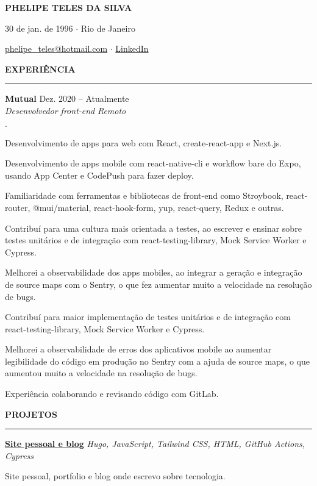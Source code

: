 \documentclass[11pt,letterpaper]{article}
\newenvironment{tightlist}
  {\begin{list}
    {$\cdot$}
    {
      \setlength{\leftmargin}{0em}
      \setlength{\itemsep}{-\smallskipamount}
    }
  }
{\end{list}}
\begin{document}
\pagestyle{empty}

\centerline{\huge\bf PHELIPE TELES DA SILVA}
\medskip

\centerline{30 de jan. de 1996 $\cdot$ Rio de Janeiro}
\smallskip

\centerline{
  \href{mailto:phelipe_teles@hotmail.com}{phelipe\_teles@hotmail.com}
  $\cdot$
  \href{https://linkedin.com/in/phelipeteles}{LinkedIn}
}
\smallskip

\medskip \textbf{EXPERIÊNCIA} \medskip
\hrule

\textbf{Mutual} \hfill Dez. 2020 -- Atualmente \\
\emph{Desenvolvedor front-end} \hfill \emph{Remoto} {\parfillskip=0pt\par}

\begin{tightlist}
  \item Desenvolvimento de apps para web com React, create-react-app e Next.js.
  \item Desenvolvimento de apps mobile com react-native-cli e workflow bare do
    Expo, usando App Center e CodePush para fazer deploy.
  \item Familiaridade com ferramentas e bibliotecas de front-end como
    Stroybook, react-router, @mui/material, react-hook-form, yup,
    react-query, Redux e outras.
  \item Contribuí para uma cultura mais orientada a testes, ao escrever e
    ensinar sobre testes unitários e de integração com
    react-testing-library, Mock Service Worker e Cypress.
  \item Melhorei a observabilidade dos apps mobiles, ao integrar a geração e
    integração de source maps com o Sentry, o que fez aumentar muito a
    velocidade na resolução de bugs.
  \item Contribuí para maior implementação de testes unitários e de integração
    com react-testing-library, Mock Service Worker e Cypress.
  \item Melhorei a observabilidade de erros dos aplicativos mobile ao aumentar
    legibilidade do código em produção no Sentry com a ajuda de source
    maps, o que aumentou muito a velocidade na resolução de bugs.
  \item Experiência colaborando e revisando código com GitLab.
\end{tightlist}

\medskip \textbf{PROJETOS} \medskip
\hrule

\textbf{\href{https://phelipetls.github.io}{Site pessoal e blog}} \hfill \emph{Hugo, JavaScript, Tailwind CSS, HTML, GitHub Actions, Cypress}
{\parfillskip=0pt\par}
Site pessoal, portfolio e blog onde escrevo sobre tecnologia.
\end{document}
